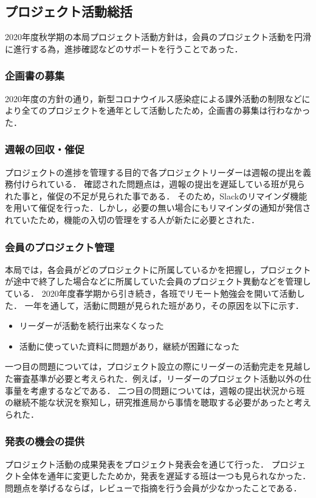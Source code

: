 \subsection*{プロジェクト活動総括}


2020年度秋学期の本局プロジェクト活動方針は，会員のプロジェクト活動を円滑に進行する為，進捗確認などのサポートを行うことであった．

\subsubsection*{企画書の募集}

2020年度の方針の通り，新型コロナウイルス感染症による課外活動の制限などにより全てのプロジェクトを通年として活動したため，企画書の募集は行わなかった．

\subsubsection*{週報の回収・催促}

プロジェクトの進捗を管理する目的で各プロジェクトリーダーは週報の提出を義務付けられている．
確認された問題点は，週報の提出を遅延している班が見られた事と，催促の不足が見られた事である．
そのため，Slackのリマインダ機能を用いて催促を行った．しかし，必要の無い場合にもリマインダの通知が発信されていたため，機能の入切の管理をする人が新たに必要とされた．

\subsubsection*{会員のプロジェクト管理}

本局では，各会員がどのプロジェクトに所属しているかを把握し，プロジェクトが途中で終了した場合などに所属していた会員のプロジェクト異動などを管理している．
2020年度春学期から引き続き，各班でリモート勉強会を開いて活動した．
一年を通して，活動に問題が見られた班があり，その原因を以下に示す．
\begin{itemize}
\item リーダーが活動を続行出来なくなった
\item 活動に使っていた資料に問題があり，継続が困難になった
\end{itemize}
一つ目の問題については，プロジェクト設立の際にリーダーの活動完走を見越した審査基準が必要と考えられた．例えば，リーダーのプロジェクト活動以外の仕事量を考慮するなどである．
二つ目の問題については，週報の提出状況から班の継続不能な状況を察知し，研究推進局から事情を聴取する必要があったと考えられた．

\subsubsection*{発表の機会の提供}
プロジェクト活動の成果発表をプロジェクト発表会を通じて行った．
プロジェクト全体を通年に変更したためか，発表を遅延する班は一つも見られなかった．
問題点を挙げるならば，レビューで指摘を行う会員が少なかったことである．

